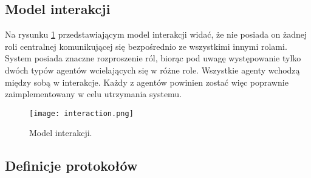 
\newpage
\subsection{Model interakcji}

Na rysunku \ref{fig:interaction} przedstawiającym model interakcji widać, że nie posiada on żadnej roli centralnej komunikującej się bezpośrednio ze wszystkimi innymi rolami. System posiada znaczne rozproszenie ról, biorąc pod uwagę występowanie tylko dwóch typów agentów wcielających się w różne role. Wszystkie agenty wchodzą między sobą w interakcje. Każdy z agentów powinien zostać więc poprawnie zaimplementowany w celu utrzymania systemu.

\begin{figure}[h!]
    \centering \texttt{[image: interaction.png]}
    \caption{Model interakcji.}
    \label{fig:interaction}
\end{figure}




\newpage
\subsection{Definicje protokołów}
